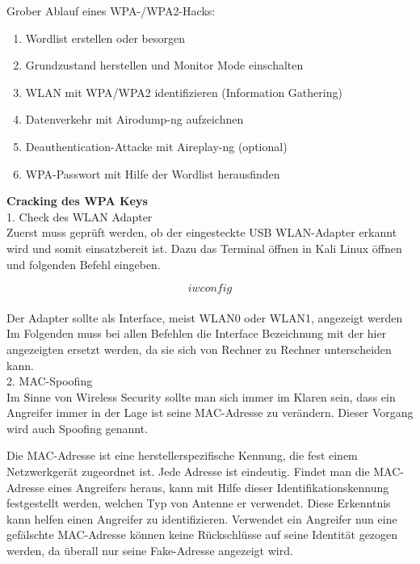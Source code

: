 Grober Ablauf eines WPA-/WPA2-Hacks:

\begin{enumerate}
\item Wordlist erstellen oder besorgen 
\item Grundzustand herstellen und Monitor Mode einschalten
\item WLAN mit WPA/WPA2 identifizieren (Information Gathering) 
\item Datenverkehr mit Airodump-ng aufzeichnen
\item Deauthentication-Attacke mit Aireplay-ng (optional)
\item WPA-Passwort mit Hilfe der Wordlist herausfinden
\end{enumerate}


\textbf{\Large{Cracking des WPA Keys}}\\ %

{\Large 1. Check des WLAN Adapter}\\

Zuerst muss geprüft werden, ob der eingesteckte USB WLAN-Adapter erkannt wird und somit einsatzbereit ist. Dazu das Terminal öffnen in Kali Linux öffnen und folgenden Befehl eingeben. 

$$iwconfig$$\\

Der Adapter sollte als Interface, meist WLAN0 oder WLAN1, angezeigt werden\\
Im Folgenden muss bei allen Befehlen die Interface Bezeichnung mit der hier angezeigten ersetzt werden, da sie sich von Rechner zu Rechner unterscheiden kann.\\


{\Large 2. MAC-Spoofing}\\

Im Sinne von Wireless Security sollte man sich immer im Klaren sein, dass ein Angreifer immer in der Lage ist seine MAC-Adresse zu verändern. Dieser Vorgang wird auch Spoofing genannt.

Die MAC-Adresse ist eine herstellerspezifische Kennung, die fest einem Netzwerkgerät zugeordnet ist. Jede Adresse ist eindeutig. Findet man die MAC-Adresse eines Angreifers heraus, kann mit Hilfe dieser Identifikationskennung festgestellt werden, welchen Typ von Antenne er verwendet. Diese Erkenntnis kann helfen einen Angreifer zu identifizieren.
Verwendet ein Angreifer nun eine gefälschte MAC-Adresse können keine Rückschlüsse auf seine Identität gezogen werden, da überall nur seine Fake-Adresse angezeigt wird.\\


